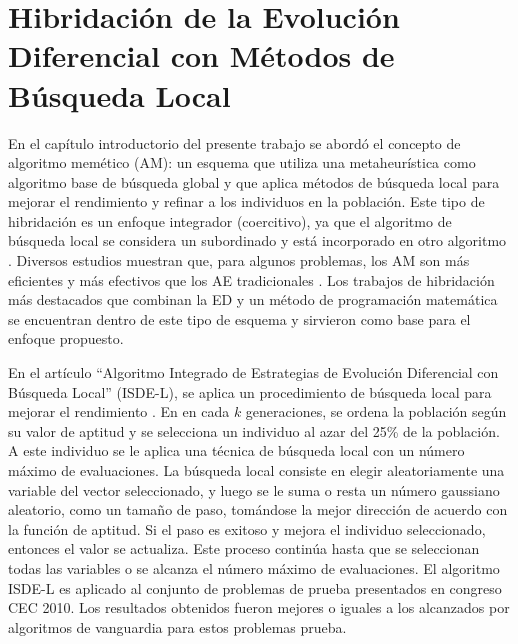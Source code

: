 \section{Hibridación de la Evolución Diferencial con Métodos de Búsqueda Local}

En el capítulo introductorio del presente trabajo se abordó el concepto de algoritmo memético (AM): un esquema que utiliza una metaheurística como algoritmo base de búsqueda global y que aplica métodos de búsqueda local para mejorar el rendimiento y refinar a los individuos en la población. Este tipo de hibridación es un enfoque integrador (coercitivo), ya que el algoritmo de búsqueda local se considera un subordinado y está incorporado en otro algoritmo \cite{raidl2006unified}. Diversos estudios muestran que, para algunos problemas, los AM son más eficientes y más efectivos que los AE tradicionales \cite{krasnogor2005tutorial}. Los trabajos de hibridación más destacados que combinan la ED y un método de programación matemática se encuentran dentro de este tipo de esquema y sirvieron como base para el enfoque propuesto.

En el artículo ``Algoritmo Integrado de Estrategias de Evolución Diferencial con Búsqueda Local''  (ISDE-L), se aplica un procedimiento de búsqueda local para mejorar el rendimiento \cite{elsayed2011integrated}. En en cada $k$ generaciones, se ordena la población según su valor de aptitud y se selecciona un individuo al azar del 25\% de la población. A este individuo se le aplica una técnica de búsqueda local con un número máximo de evaluaciones. La búsqueda local consiste en elegir aleatoriamente una variable del vector seleccionado, y luego se le suma o resta un número gaussiano aleatorio, como un tamaño de paso, tomándose la mejor dirección de acuerdo con la función de aptitud. Si el paso es exitoso y  mejora el individuo seleccionado, entonces el valor se actualiza. Este proceso continúa hasta que se seleccionan todas las variables o se alcanza el número máximo de evaluaciones. El algoritmo ISDE-L es aplicado al conjunto de problemas de prueba presentados en congreso CEC 2010. Los resultados obtenidos fueron mejores o iguales a los alcanzados por algoritmos de vanguardia para estos problemas prueba.

